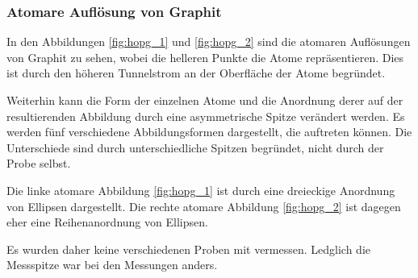 \documentclass[12pt,a4paper]{scrartcl}
\numberwithin{equation}{section} %
\begin{document}
\hypertarget{HOPC atomar}{
\subsubsection{Atomare Auflösung von Graphit}\label{HOPC atomar}}
In den Abbildungen \ref{fig:hopg_1} und \ref{fig:hopg_2} sind die atomaren Auflösungen von Graphit zu sehen, wobei die helleren Punkte die Atome repräsentieren. Dies ist durch den höheren Tunnelstrom an der Oberfläche der Atome begründet. \cite{Mizes}

Weiterhin kann die Form der einzelnen Atome und die Anordnung derer auf der resultierenden Abbildung durch eine asymmetrische Spitze verändert werden. \cite{Mizes} Es werden fünf verschiedene Abbildungsformen dargestellt, die auftreten können. Die Unterschiede sind durch unterschiedliche Spitzen begründet, nicht durch der Probe selbst.

Die linke atomare Abbildung \ref{fig:hopg_1} ist durch eine dreieckige Anordnung von Ellipsen dargestellt. Die rechte atomare Abbildung \ref{fig:hopg_2} ist dagegen eher eine Reihenanordnung von Ellipsen.

Es wurden daher keine verschiedenen Proben mit vermessen. Ledglich die Messspitze war bei den Messungen anders.
\end{document}
